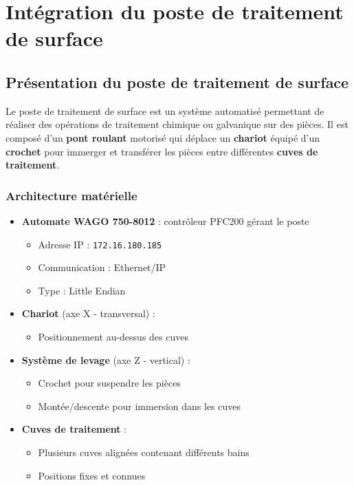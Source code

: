 \section{Intégration du poste de traitement de surface}


\subsection{Présentation du poste de traitement de surface}

Le poste de traitement de surface est un système automatisé permettant de réaliser des opérations de traitement chimique ou galvanique sur des pièces. Il est composé d'un \textbf{pont roulant} motorisé qui déplace un \textbf{chariot} équipé d'un \textbf{crochet} pour immerger et transférer les pièces entre différentes \textbf{cuves de traitement}.

\subsubsection{Architecture matérielle}

\begin{itemize}
    \item \textbf{Automate WAGO 750-8012} : contrôleur PFC200 gérant le poste
    \begin{itemize}
        \item Adresse IP : \texttt{172.16.180.185}
        \item Communication : Ethernet/IP
        \item Type : Little Endian
    \end{itemize}

    \item \textbf{Chariot} (axe X - transversal) :
    \begin{itemize}
        \item Positionnement au-dessus des cuves
    \end{itemize}

    \item \textbf{Système de levage} (axe Z - vertical) :
    \begin{itemize}
        \item Crochet pour suspendre les pièces
        \item Montée/descente pour immersion dans les cuves
    \end{itemize}

    \item \textbf{Cuves de traitement} :
    \begin{itemize}
        \item Plusieurs cuves alignées contenant différents bains
        \item Positions fixes et connues
    \end{itemize}
\end{itemize}


